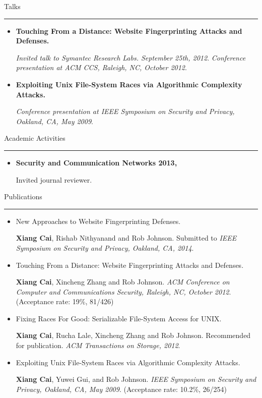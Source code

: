\documentclass[11pt,oneside]{article}
\newenvironment{ressection}[1]{
	{\fontfamily{phv}\selectfont\Large#1}
	
	\vspace{-8pt} \rule{\textwidth}{.5pt}
	
	\vspace{-4pt}
	\begin{itemize}
	\vspace{.5pt}
}{
	\end{itemize}
}
\newcommand{\resitem}[1]{
	\vspace{2pt}
	\item \begin{flushleft} #1 \end{flushleft}
}
\begin{document}
\begin{ressection}{Talks}
	\resitem{\textbf{Touching From a Distance: Website Fingerprinting
		Attacks and Defenses.} \begin{small}
		
		\textit{Invited talk to Symantec Research Labs. September 25th, 2012}. \textit{Conference presentation at ACM CCS, Raleigh, NC, October 2012}.
		\end{small}}

	\resitem{\textbf{Exploiting Unix File-System Races via Algorithmic
		Complexity Attacks.} \begin{small}
		
		\textit{Conference presentation at IEEE Symposium on Security and Privacy, Oakland, CA, May 2009}.
		\end{small}}
\end{ressection}

\begin{ressection}{Academic Activities}
	\resitem{\textbf{Security and Communication Networks 2013, } \begin{small}Invited journal reviewer.\end{small}
	}
\end{ressection}


\begin{ressection}{Publications}
	\resitem{New Approaches to Website Fingerprinting Defenses. \begin{small} \textbf{Xiang Cai}, Rishab Nithyanand
			and Rob Johnson. Submitted to \textit{IEEE Symposium on Security and Privacy,
				Oakland, CA, 2014}.
	\end{small}}

	\resitem{Touching From a Distance: Website Fingerprinting
		Attacks and Defenses. \begin{small} \textbf{Xiang Cai}, Xincheng Zhang
			and Rob Johnson. \textit{ACM Conference on Computer and Communications Security, Raleigh, NC, October 2012}. (Acceptance rate: 19\%, 81/426)\end{small}}

	\resitem{Fixing Races For Good: Serializable File-System
		Access for UNIX. \begin{small} \textbf{Xiang Cai}, Rucha Lale,
		Xincheng Zhang and Rob Johnson. Recommended for publication. \textit{ACM Transactions on Storage, 2012}.\end{small}}

	\resitem{Exploiting Unix File-System Races via Algorithmic
		Complexity Attacks. \begin{small} \textbf{Xiang Cai}, Yuwei Gui, and
			Rob Johnson. \textit{IEEE Symposium on Security and Privacy,
				Oakland, CA, May 2009}. (Acceptance rate: 10.2\%, 26/254)\end{small}}

\end{ressection}
\end{document}

